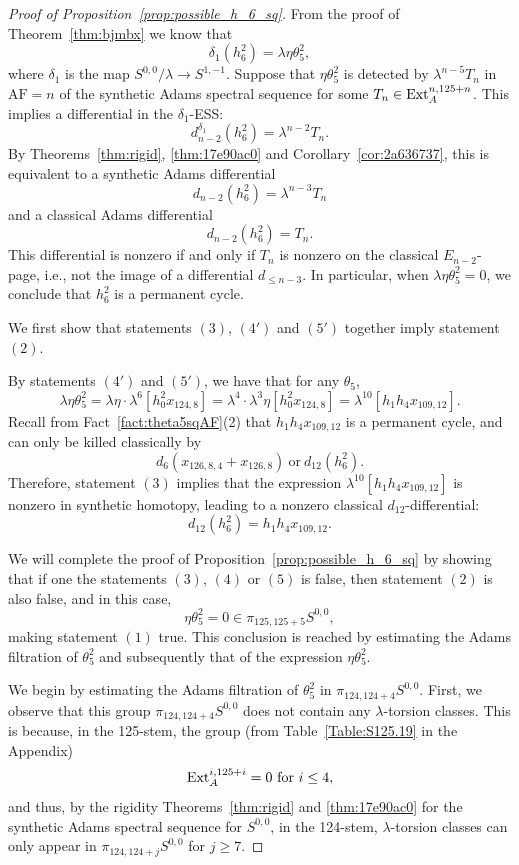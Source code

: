\documentclass{amsart}
\numberwithin{equation}{section}
\newcommand{\AF}{\mathrm{AF}}
\begin{document}
\begin{proof}[Proof of Proposition~\ref{prop:possible_h_6_sq}]
    From the proof of Theorem~\ref{thm:bjmbx} \cite{BurklundXu} we know that
    $$\delta_1(h_6^2) = \lambda \eta \theta_5^2,$$
    where $\delta_1$ is the map $S^{0,0}/\lambda \rightarrow S^{1,-1}$. Suppose that $\eta \theta_5^2$ is detected by $\lambda^{n-5} T_n$ in $\AF = n$ of the synthetic Adams spectral sequence for some $T_n \in \mathrm{Ext}_A^{n, 125+n}$. This implies a differential in the $\delta_1$-ESS:
    $$d_{n-2}^{\delta_1} (h_6^2) = \lambda^{n-2} T_n.$$
    By Theorems~\ref{thm:rigid}, \ref{thm:17e90ac0} and Corollary~\ref{cor:2a636737}, this is equivalent to a 
    synthetic Adams differential
    $$d_{n-2} (h_6^2) = \lambda^{n-3} T_n$$
    and a classical Adams differential
    $$d_{n-2} (h_6^2) = T_n.$$
    This differential is nonzero if and only if $T_n$ is nonzero on the classical $E_{n-2}$-page, i.e., not the image of a differential $d_{\le n-3}$. In particular, when $\lambda \eta \theta_5^2=0$, we conclude that $h_6^2$ is a permanent cycle.

    We first show that statements $(3)$, $(4')$ and $(5')$ together imply statement $(2)$.

    By statements $(4')$ and $(5')$, we have that for any $\theta_5$,
    $$\lambda \eta \theta_5^2 = \lambda \eta \cdot \lambda^6 [h_0^2x_{124,8}] = \lambda^4 \cdot \lambda^3 \eta [h_0^2x_{124,8}] = \lambda^{10} [h_1h_4x_{109,12}].$$
Recall from Fact~\ref{fact:theta5sqAF}(2) that $h_1h_4x_{109,12}$ is a permanent cycle, and can only be killed classically by 
    $$d_6(x_{126,8,4} + x_{126,8}) \ \text{or} \ d_{12}(h_6^2).$$
    Therefore, statement $(3)$ implies that the expression $\lambda^{10} [h_1h_4x_{109,12}]$ is nonzero in synthetic homotopy, leading to a nonzero classical $d_{12}$-differential:
    $$d_{12}(h_6^2) = h_1h_4x_{109,12}.$$
    
We will complete the proof of
    Proposition~\ref{prop:possible_h_6_sq} by showing that if one the statements $(3)$, $(4)$ or $(5)$ is false, then statement $(2)$ is also false, and in this case, 
    $$\eta \theta_5^2 = 0 \in \pi_{125,125+5} S^{0,0},$$ 
    making statement $(1)$ true. This conclusion is reached by estimating the Adams filtration of $\theta_5^2$ and subsequently that of the expression $\eta \theta_5^2$. 



We begin by estimating the Adams filtration of $\theta_5^2$ in   $\pi_{124,124+4} S^{0,0}$. First, we observe that this group  $\pi_{124,124+4} S^{0,0}$ does not contain any $\lambda$-torsion classes. 
This is because, in the 125-stem, the group (from Table~\ref{Table:S125.19} in the Appendix) 
$$\mathrm{Ext}_A^{i,125+i} = 0 \ \text{for} \ i\leq 4,$$ 
and thus, by the rigidity Theorems~\ref{thm:rigid} and \ref{thm:17e90ac0} for the synthetic Adams spectral sequence for $S^{0,0}$, in the 124-stem, $\lambda$-torsion classes can only appear in $\pi_{124,124+j} S^{0,0}$ for $j \geq 7$.


\end{proof}
\end{document}
